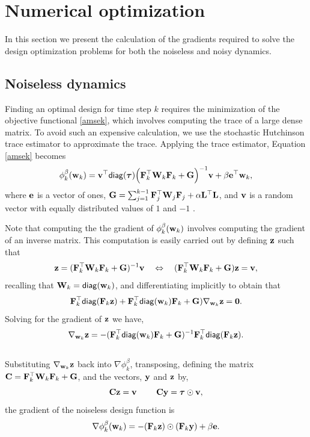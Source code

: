 \documentclass[11pt]{article}
\begin{document}
\section{Numerical optimization}
\label{sec:Opt}
In this section we present the calculation of the gradients required to solve the design optimization problems for both the noiseless and noisy dynamics. 
\subsection{Noiseless dynamics}
Finding an optimal design for  time step $k$ requires the minimization of the objective functional \eqref{amsek}, which involves computing the trace of a large dense matrix. To avoid such an expensive calculation, we use the stochastic Hutchinson trace estimator to approximate the trace. Applying the trace estimator, Equation \eqref{amsek} becomes
\begin{equation*}
\phi_k^{\beta}({\bf{w}}_k) = {\bf{v}}^{\top}{\sf diag}({\boldsymbol \tau}) \Big({\bf{F}}_k^{\top}{\bf{W}}_k{\bf{F}}_k   + {\bf{G}} \Big)^{-1}{\bf{v}} + \beta{\bf{e}}^{\top}{\bf{w}}_k,
\end{equation*}
where ${\bf{e}}$ is a vector of ones, ${\bf{G}} = \sum_{j=1}^{k-1}{\bf{F}}_{j}^{\top}{\bf{W}}_{j}{\bf{F}}_{j}+ \alpha{\bf{L}}^{\top}{\bf{L}}$, and ${\bf{v}}$ is a random vector with equally distributed values of $1$ and $-1$ \cite{Hutchinson1990,Haber2011}. 


Note that computing the the gradient of $\phi_k^{\beta}({\bf{w}}_k)$ involves computing the gradient of an inverse matrix.
This computation is easily carried out by defining ${\bf{z}}$ such that
\begin{equation}
\label{eq:z}
{\bf{z}} = ({\bf{F}}_k^{\top}{\bf{W}}_k{\bf{F}}_k   + {\bf{G}})^{-1}{\bf{v}} \quad \Leftrightarrow \quad
({\bf{F}}_k^{\top}{\bf{W}}_k{\bf{F}}_k   + {\bf{G}}){\bf{z}} = {\bf{v}},
\end{equation}
  recalling that ${\bf{W}}_k = {\sf diag}({\bf{w}}_k)$, and differentiating implicitly to obtain that
\begin{equation*}
{\bf{F}}_k^{\top}{\sf diag}({\bf{F}}_k{\bf{z}}) + {\bf{F}}_k^{\top}{\sf diag}({\bf{w}}_k){\bf{F}}_k +{\bf{G}}){\bf{ \nabla}}_{{\bf{w}}_k}{\bf{z}} ={\bf 0}.
\end{equation*}
Solving for the gradient of ${\bf{z}}$ we have,
\begin{equation*}
\nabla_{{\bf{w}}_k}{\bf{z}} = -({\bf{F}}_k^{\top}{\sf diag}({\bf{w}}_k){\bf{F}}_k +{\bf{G}})^{-1} {\bf{F}}_k^{\top}{\sf diag}({\bf{F}}_k{\bf{z}}).
\end{equation*}
\\
Substituting $\nabla_{{\bf{w}}_k}{\bf{z}}$ back into $\nabla\phi_k^{\beta}$, transposing, defining the matrix ${\bf{C}} = {\bf{F}}_k^{\top}{\bf{W}}_k{\bf{F}}_k   + {\bf{G}}$, and the vectors, ${\bf{y}}$ and ${\bf{z}}$ by, 
$${\bf{C}}{\bf{z}} = {\bf{v}}\ \quad \quad {\bf{C}}{\bf{y}} ={\boldsymbol \tau}\odot{\bf{v}}, $$ 
the gradient of the noiseless design function is
\begin{equation}
\nabla\phi_k^{\beta}({\bf{w}}_k) =  -({\bf{F}}_k{\bf{z}})\odot({\bf{F}}_k{\bf{y}}) + \beta{\bf{e}}.
\end{equation}
\end{document}
